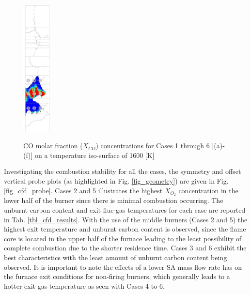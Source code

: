 \documentclass[twocolumn,10pt]{asme2ej}
\begin{document}
\begin{figure}[h!]
{				\includegraphics[height = 7cm]{FBRM05_ISO_COPPM_S}}
\caption{CO molar fraction ($X_{CO}$) concentrations for 
Cases 1 through 6 [(a)-(f)] on a temperature iso-surface of 1600 [K]}
\label{fig_cfd_coppm}
\end{figure}

Investigating the combustion stability for all the cases, the symmetry and offset vertical probe plots (as highlighted in Fig. \ref{fig_geometry}) are given in Fig. \ref{fig_cfd_probe}. Cases 2 and 5 illustrates the highest $X_{O_{2}}$ concentration in the lower half of the burner since there is minimal combustion occurring. The unburnt carbon content and exit flue-gas temperatures for each case are reported in Tab. \ref{tbl_cfd_results}. With the use of the middle burners (Cases 2 and 5) the highest exit temperature and unburnt carbon content is observed, since the flame core is located in the upper half of the furnace leading to the least possibility of complete combustion due to the shorter residence time. Cases 3 and 6 exhibit the best characteristics with the least amount of unburnt carbon content being observed. It is important to note the effects of a lower SA mass flow rate has on the furnace exit conditions for non-firing burners, which generally leads to a hotter exit gas temperature as seen with Cases 4 to 6. \\
\end{document}
